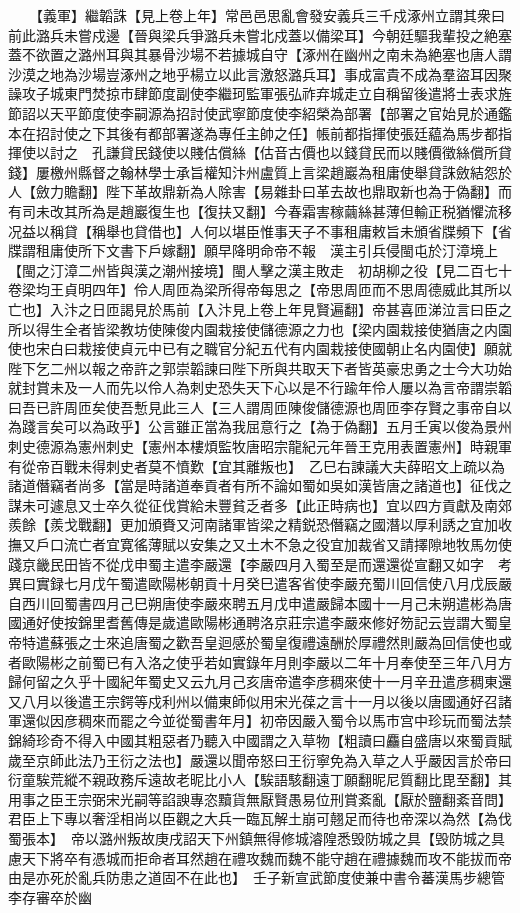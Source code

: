 　　【義軍】繼韜誅【見上卷上年】常邑邑思亂會發安義兵三千戍涿州立謂其衆曰前此潞兵未嘗戍邊【晉與梁兵爭潞兵未嘗北戍蓋以備梁耳】今朝廷驅我輩投之絶塞蓋不欲置之潞州耳與其暴骨沙場不若據城自守【涿州在幽州之南未為絶塞也唐人謂沙漠之地為沙場豈涿州之地乎楊立以此言激怒潞兵耳】事成富貴不成為羣盜耳因聚譟攻子城東門焚掠市肆節度副使李繼珂監軍張弘祚弃城走立自稱留後遣將士表求旌節詔以天平節度使李嗣源為招討使武寧節度使李紹榮為部署【部署之官始見於通鑑本在招討使之下其後有都部署遂為專任主帥之任】帳前都指揮使張廷藴為馬步都指揮使以討之　孔謙貸民錢使以賤估償絲【估音古價也以錢貸民而以賤價徵絲償所貸錢】屢檄州縣督之翰林學士承旨權知汴州盧質上言梁趙巖為租庸使舉貸誅斂結怨於人【斂力贍翻】陛下革故鼎新為人除害【易雜卦曰革去故也鼎取新也為于偽翻】而有司未改其所為是趙巖復生也【復扶又翻】今春霜害稼繭絲甚薄但輸正税猶懼流移况益以稱貸【稱舉也貸借也】人何以堪臣惟事天子不事租庸敕旨未頒省牒頻下【省牒謂租庸使所下文書下戶嫁翻】願早降明命帝不報　漢主引兵侵閩屯於汀漳境上【閩之汀漳二州皆與漢之潮州接境】閩人擊之漢主敗走　初胡柳之役【見二百七十卷梁均王貞明四年】伶人周匝為梁所得帝每思之【帝思周匝而不思周德威此其所以亡也】入汴之日匝謁見於馬前【入汴見上卷上年見賢遍翻】帝甚喜匝涕泣言曰臣之所以得生全者皆梁教坊使陳俊内園栽接使儲德源之力也【梁内園栽接使猶唐之内園使也宋白曰栽接使貞元中已有之職官分紀五代有内園栽接使國朝止名内園使】願就陛下乞二州以報之帝許之郭崇韜諫曰陛下所與共取天下者皆英豪忠勇之士今大功始就封賞未及一人而先以伶人為刺史恐失天下心以是不行踰年伶人屢以為言帝謂崇韜曰吾已許周匝矣使吾慙見此三人【三人謂周匝陳俊儲德源也周匝李存賢之事帝自以為踐言矣可以為政乎】公言雖正當為我屈意行之【為于偽翻】五月壬寅以俊為景州刺史德源為憲州刺史【憲州本樓煩監牧唐昭宗龍紀元年晉王克用表置憲州】時親軍有從帝百戰未得刺史者莫不憤歎【宜其離叛也】　乙巳右諫議大夫薛昭文上疏以為諸道僭竊者尚多【當是時諸道奉貢者有所不論如蜀如吳如漢皆唐之諸道也】征伐之謀未可遽息又士卒久從征伐賞給未豐貧乏者多【此正時病也】宜以四方貢獻及南郊羨餘【羨戈戰翻】更加頒賚又河南諸軍皆梁之精鋭恐僭竊之國潛以厚利誘之宜加收撫又戶口流亡者宜寛徭薄賦以安集之又土木不急之役宜加裁省又請擇隙地牧馬勿使踐京畿民田皆不從戊申蜀主遣李嚴還【李嚴四月入蜀至是而還還從宣翻又如字　考異曰實録七月戊午蜀遣歐陽彬朝貢十月癸巳遣客省使李嚴充蜀川回信使八月戊辰嚴自西川回蜀書四月己巳朔唐使李嚴來聘五月戊申遣嚴歸本國十一月己未朔遣彬為唐國通好使按錦里耆舊傳是歲遣歐陽彬通聘洛京莊宗遣李嚴來修好笏記云豈謂大蜀皇帝特遣蘇張之士來追唐蜀之歡吾皇迴感於蜀皇復禮遠酬於厚禮然則嚴為回信使也或者歐陽彬之前蜀已有入洛之使乎若如實錄年月則李嚴以二年十月奉使至三年八月方歸何留之久乎十國紀年蜀史又云九月己亥唐帝遣李彦稠來使十一月辛丑遣彦稠東還又八月以後遣王宗鍔等戍利州以備東師似用宋光葆之言十一月以後以唐國通好召諸軍還似因彦稠來而罷之今並從蜀書年月】初帝因嚴入蜀令以馬市宫中珍玩而蜀法禁錦綺珍奇不得入中國其粗惡者乃聽入中國謂之入草物【粗讀曰麤自盛唐以來蜀貢賦歲至京師此法乃王衍之法也】嚴還以聞帝怒曰王衍寧免為入草之人乎嚴因言於帝曰衍童騃荒縱不親政務斥遠故老昵比小人【騃語駭翻遠丁願翻昵尼質翻比毘至翻】其用事之臣王宗弼宋光嗣等諂諛專恣黷貨無厭賢愚易位刑賞紊亂【厭於鹽翻紊音問】君臣上下專以奢淫相尚以臣觀之大兵一臨瓦解土崩可翹足而待也帝深以為然【為伐蜀張本】　帝以潞州叛故庚戌詔天下州鎮無得修城濬隍悉毁防城之具【毁防城之具慮天下將卒有憑城而拒命者耳然趙在禮攻魏而魏不能守趙在禮據魏而攻不能拔而帝由是亦死於亂兵防患之道固不在此也】　壬子新宣武節度使兼中書令蕃漢馬步總管李存審卒於幽